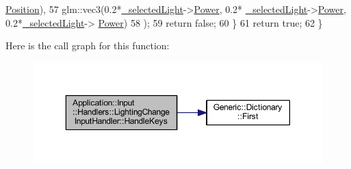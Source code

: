 \begin{DoxyCode}
      \mbox{\hyperlink{classLight_ab6a04fde7b96f06ab935cd1d53b91e0b}{Position}}), 
57             glm::vec3(0.2*\mbox{\hyperlink{classApplication_1_1Input_1_1Handlers_1_1LightingChangeInputHandler_a9d2d27b234fd09b3add304963534b719}{\_selectedLight}}->\mbox{\hyperlink{classLight_a161f4944da390d9bc388091bafd59fe3}{Power}}, 0.2*
      \mbox{\hyperlink{classApplication_1_1Input_1_1Handlers_1_1LightingChangeInputHandler_a9d2d27b234fd09b3add304963534b719}{\_selectedLight}}->\mbox{\hyperlink{classLight_a161f4944da390d9bc388091bafd59fe3}{Power}}, 0.2*\mbox{\hyperlink{classApplication_1_1Input_1_1Handlers_1_1LightingChangeInputHandler_a9d2d27b234fd09b3add304963534b719}{\_selectedLight}}->
      \mbox{\hyperlink{classLight_a161f4944da390d9bc388091bafd59fe3}{Power}})
58         );
59         \textcolor{keywordflow}{return} \textcolor{keyword}{false};
60     \}
61     \textcolor{keywordflow}{return} \textcolor{keyword}{true};
62 \}
\end{DoxyCode}
Here is the call graph for this function\+:
\nopagebreak
\begin{figure}[H]
\begin{center}
\leavevmode
\includegraphics[width=350pt]{classApplication_1_1Input_1_1Handlers_1_1LightingChangeInputHandler_a5017479d6edea9d6bedf3093cf49cb24_cgraph}
\end{center}
\end{figure}
\mbox{\label{classEngine_1_1Components_1_1BaseInputHandler_a8b50fb66d01573616072d708075a721e}} 
